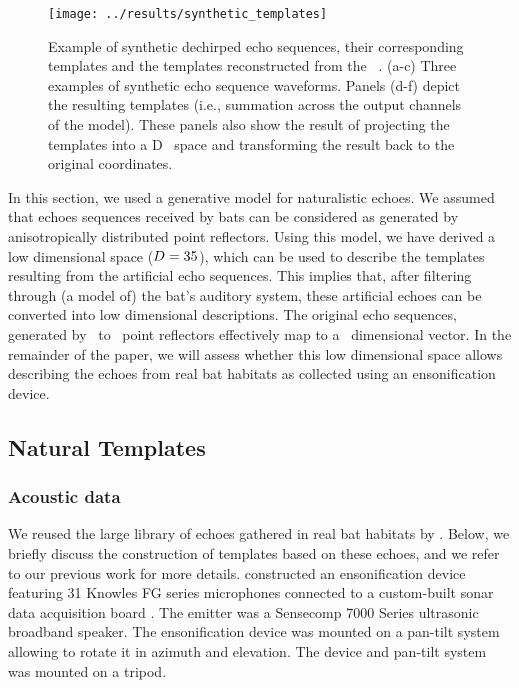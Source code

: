\documentclass[preprint,5p]{elsarticle}
\begin{document}
\begin{figure}[tb]
	\centering
	\texttt{[image: ../results/synthetic\_templates]}
	\caption{Example of synthetic dechirped echo sequences, their corresponding templates and the templates reconstructed from the \pca\ \pcs. (a-c) Three examples of synthetic echo sequence waveforms. Panels (d-f) depict the resulting templates (i.e., summation across the output channels of the \citet{Wiegrebe2008} model). These panels also show the result of projecting the templates into a \pca D \pc\ space and transforming the result back to the original coordinates.}
	\label{fig:synthetictemplates}
\end{figure}

In this section, we  used a generative model for naturalistic echoes. We assumed that echoes sequences received by bats can be considered as generated by anisotropically distributed point reflectors. Using this model, we have derived a low dimensional space ($D = 35$), which can be used to describe the templates resulting from the artificial echo sequences. This implies that, after filtering through (a model of) the bat's auditory system, these artificial echoes can be converted into low dimensional descriptions. The original echo sequences, generated by \MinDiracs\ to \MaxDiracs\ point reflectors effectively map to a \pca\ dimensional vector. In the remainder of the paper, we will assess whether this low dimensional space allows describing the echoes from real bat habitats as collected using an ensonification device.

\subsection{Natural Templates}

\subsubsection{Acoustic data}

We reused the large library of echoes gathered in real bat habitats by \citet{Vanderelst2016}. Below, we briefly discuss the construction of templates based on these echoes, and we refer to our previous work for more details. \citet{Vanderelst2016} constructed an ensonification device featuring 31 Knowles FG series microphones connected to a custom-built sonar data acquisition board \citep{Steckel2013a}. The emitter was a Sensecomp 7000 Series ultrasonic broadband speaker. The ensonification device was mounted on a pan-tilt system allowing to rotate it in azimuth and elevation. The device and pan-tilt system was mounted on a tripod.
\end{document}

